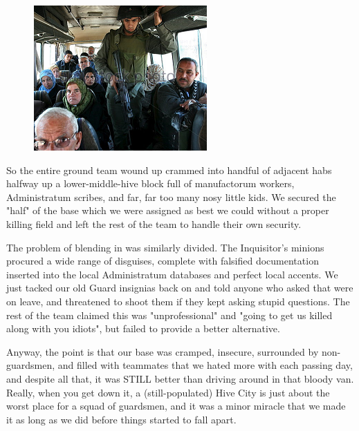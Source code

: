 \begin{figure}
	\begin{center}
		\includegraphics[width=\figwidth]{pics/17/32.png}
	\end{center}
\end{figure}
So the entire ground team wound up crammed into handful of adjacent habs halfway up a lower-middle-hive block full of manufactorum workers, Administratum scribes, and far, far too many nosy little kids. 
We secured the "half" of the base which we were assigned as best we could without a proper killing field and left the rest of the team to handle their own security.

The problem of blending in was similarly divided. 
The Inquisitor's minions procured a wide range of disguises, complete with falsified documentation inserted into the local Administratum databases and perfect local accents. 
We just tacked our old Guard insignias back on and told anyone who asked that were on leave, and threatened to shoot them if they kept asking stupid questions. 
The rest of the team claimed this was "unprofessional" and "going to get us killed along with you idiots", but failed to provide a better alternative.

Anyway, the point is that our base was cramped, insecure, surrounded by non-guardsmen, and filled with teammates that we hated more with each passing day, and despite all that, it was STILL better than driving around in that bloody van. 
Really, when you get down it, a (still-populated) Hive City is just about the worst place for a squad of guardsmen, and it was a minor miracle that we made it as long as we did before things started to fall apart.

